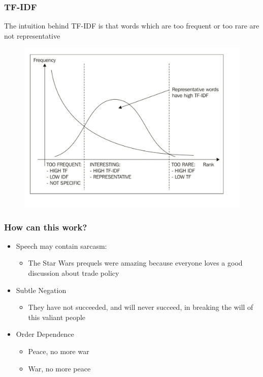 \documentclass[compress, aspectratio=54]{beamer}
\begin{document}


\begin{frame}
\frametitle{TF-IDF}
The intuition behind TF-IDF is that words which are too frequent or too rare are not representative
\begin{figure}

\includegraphics[width=0.65\linewidth ]{Figures/tf-idf.png}
\end{figure}
\end{frame}




\begin{frame}
\frametitle{How can this work?}

\begin{itemize}
\item Speech may contain sarcasm:
\begin{itemize}

\item The Star Wars prequels were amazing because everyone
loves a good discussion about trade policy
\end{itemize}

\item Subtle Negation
\begin{itemize}

\item They have not succeeded, and will never succeed, in
breaking the will of this valiant people
\end{itemize}
\item Order Dependence
\begin{itemize}
\item Peace, no more war
\item War, no more peace
\end{itemize}
\end{itemize}
\end{frame}
\end{document}

